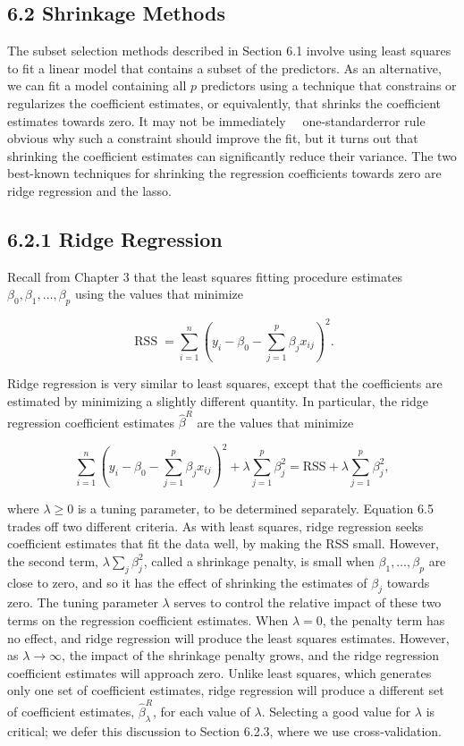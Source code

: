 \documentclass[10pt]{article}
\begin{document}
\subsection*{6.2 Shrinkage Methods}
The subset selection methods described in Section 6.1 involve using least squares to fit a linear model that contains a subset of the predictors. As an alternative, we can fit a model containing all $p$ predictors using a technique that constrains or regularizes the coefficient estimates, or equivalently, that shrinks the coefficient estimates towards zero. It may not be immediately\
\
one-standarderror rule\\
obvious why such a constraint should improve the fit, but it turns out that shrinking the coefficient estimates can significantly reduce their variance. The two best-known techniques for shrinking the regression coefficients towards zero are ridge regression and the lasso.

\subsection*{6.2.1 Ridge Regression}
Recall from Chapter 3 that the least squares fitting procedure estimates $\beta_{0}, \beta_{1}, \ldots, \beta_{p}$ using the values that minimize

$$
\operatorname{RSS}=\sum_{i=1}^{n}\left(y_{i}-\beta_{0}-\sum_{j=1}^{p} \beta_{j} x_{i j}\right)^{2} .
$$

Ridge regression is very similar to least squares, except that the coefficients are estimated by minimizing a slightly different quantity. In particular, the ridge regression coefficient estimates $\hat{\beta}^{R}$ are the values that minimize


\begin{equation*}
\sum_{i=1}^{n}\left(y_{i}-\beta_{0}-\sum_{j=1}^{p} \beta_{j} x_{i j}\right)^{2}+\lambda \sum_{j=1}^{p} \beta_{j}^{2}=\mathrm{RSS}+\lambda \sum_{j=1}^{p} \beta_{j}^{2}, \tag{6.5}
\end{equation*}


where $\lambda \geq 0$ is a tuning parameter, to be determined separately. Equation 6.5 trades off two different criteria. As with least squares, ridge regression seeks coefficient estimates that fit the data well, by making the RSS small. However, the second term, $\lambda \sum_{j} \beta_{j}^{2}$, called a shrinkage penalty, is small when $\beta_{1}, \ldots, \beta_{p}$ are close to zero, and so it has the effect of shrinking the estimates of $\beta_{j}$ towards zero. The tuning parameter $\lambda$ serves to control the relative impact of these two terms on the regression coefficient estimates. When $\lambda=0$, the penalty term has no effect, and ridge regression will produce the least squares estimates. However, as $\lambda \rightarrow \infty$, the impact of the shrinkage penalty grows, and the ridge regression coefficient estimates will approach zero. Unlike least squares, which generates only one set of coefficient estimates, ridge regression will produce a different set of coefficient estimates, $\hat{\beta}_{\lambda}^{R}$, for each value of $\lambda$. Selecting a good value for $\lambda$ is critical; we defer this discussion to Section 6.2.3, where we use cross-validation.
\end{document}
